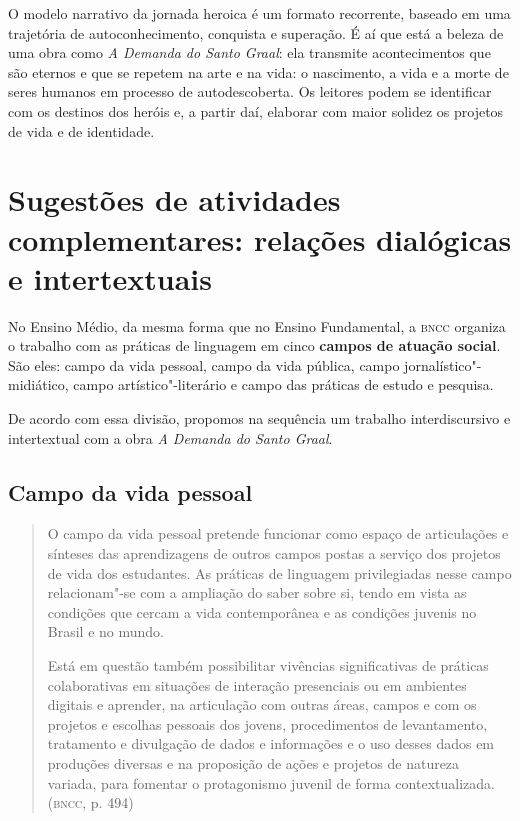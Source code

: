 \documentclass[11pt]{extarticle}
\begin{document}
O modelo narrativo da jornada heroica é um formato recorrente, baseado
em uma trajetória de autoconhecimento, conquista e superação. É aí que
está a beleza de uma obra como \emph{A Demanda do Santo Graal}: ela
transmite acontecimentos que são eternos e que se repetem na arte e na
vida: o nascimento, a vida e a morte de seres humanos em processo de
autodescoberta. Os leitores podem se identificar com os destinos dos
heróis e, a partir daí, elaborar com maior solidez os projetos de vida e
de identidade.

\section{Sugestões de atividades complementares: relações dialógicas e intertextuais}


No Ensino Médio, da mesma forma que no Ensino Fundamental, a \textsc{bncc}
organiza o trabalho com as práticas de linguagem em cinco \textbf{campos
de atuação social}. São eles: campo da vida pessoal, campo da vida
pública, campo jornalístico"-midiático, campo artístico"-literário e campo
das práticas de estudo e pesquisa.

De acordo com essa divisão, propomos na sequência um trabalho
interdiscursivo e intertextual com a obra \emph{A Demanda do Santo
Graal}.

\subsection{Campo da vida pessoal}

\begin{quote}
O campo da vida pessoal pretende funcionar como espaço de articulações
e sínteses das aprendizagens de outros campos postas a serviço dos
projetos de vida dos estudantes. As práticas de linguagem privilegiadas
nesse campo relacionam"-se com a ampliação do saber sobre si, tendo em
vista as condições que cercam a vida contemporânea e as condições
juvenis no Brasil e no mundo.

Está em questão também possibilitar vivências significativas de práticas
colaborativas em situações de interação presenciais ou em ambientes
digitais e aprender, na articulação com outras áreas, campos e com os
projetos e escolhas pessoais dos jovens, procedimentos de levantamento,
tratamento e divulgação de dados e informações e o uso desses dados em
produções diversas e na proposição de ações e projetos de natureza
variada, para fomentar o protagonismo juvenil de forma
contextualizada. (\textsc{bncc}, p. 494)
\end{quote}
\end{document}
